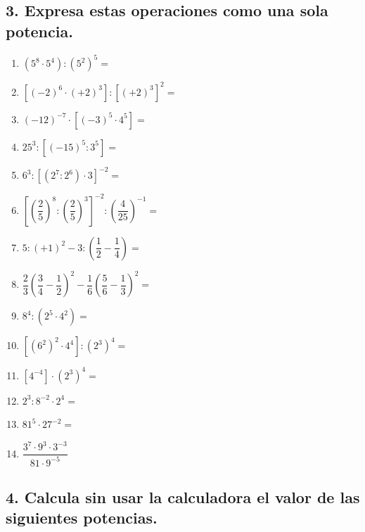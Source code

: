 \documentclass[a4paper,12pt]{article}
\begin{document}
\vspace{0.5cm}

\subsection*{3. Expresa estas operaciones como una sola potencia.}

\begin{enumerate}[label=\alph*.]
    \item $(5^{8} \cdot 5^{4}) : (5^{2})^{5} =$
    \item $[(-2)^{6} \cdot (+2)^{3}] : [(+2)^{3}]^{2} =$
    \item $(-12)^{-7} \cdot [(-3)^{5} \cdot 4^{5}] =$
    \item $25^{3} : [(-15)^{5} : 3^{5}] =$
    \item $6^{3} : [(2^{7} : 2^{6}) \cdot 3]^{-2} =$
    \item $\left[\left(\dfrac{2}{5}\right)^{8} : \left(\dfrac{2}{5}\right)^{3}\right]^{-2} : \left(\dfrac{4}{25}\right)^{-1} =$
    \item $5 : (+1)^{2} - 3 : \left(\dfrac{1}{2} - \dfrac{1}{4}\right) =$
    \item $\dfrac{2}{3}\left(\dfrac{3}{4} - \dfrac{1}{2}\right)^{2} - \dfrac{1}{6}\left(\dfrac{5}{6} - \dfrac{1}{3}\right)^{2} =$
    \item $8^{4} : (2^{5} \cdot 4^{2}) =$
    \item $[(6^{2})^{2} \cdot 4^{4}] : (2^{3})^{4} =$
    \item $[4^{-4}] \cdot (2^{3})^{4} =$
    \item $2^{3} : 8^{-2} \cdot 2^{4} =$
    \item $81^{5} \cdot 27^{-2} =$
    \item $\dfrac{3^{7} \cdot 9^{3} \cdot 3^{-3}}{81 \cdot 9^{-5}}$
\end{enumerate}

\vspace{0.5cm}

\subsection*{4. Calcula sin usar la calculadora el valor de las siguientes potencias.}
\end{document}
